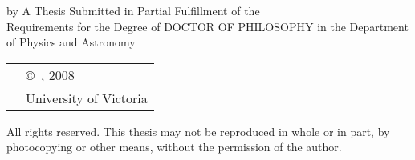 
\pagebreak
{
	\centering
	\thesistitle
	\tpbreak
	by
	\tpbreak
	\nameanddegrees
	\tpbreak
	A Thesis Submitted in Partial Fulfillment of the \\
	Requirements for the Degree of
	\tpbreak
	DOCTOR OF PHILOSOPHY
	\tpbreak
	in the Department of Physics and Astronomy\\
	\vfill
	\begin{tabular}{cl}
		& \copyright\ \yourname, 2008\\
		& \phantom{\copyright} University of Victoria
	\end{tabular}
	\tpbreak
	All rights reserved. This thesis may not be reproduced in whole or in part, by \\
	\hfill photocopying or other means, without the permission of the author. 
	\hfill
}
\pagebreak
